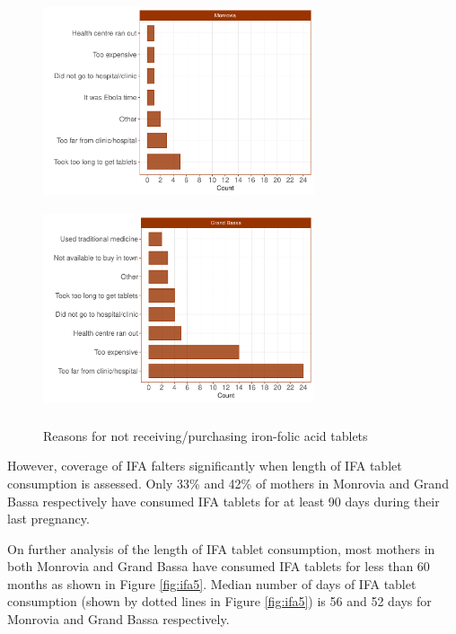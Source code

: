 \documentclass[12pt,a4paper]{article}
\begin{document}
\begin{figure}[H]

{\centering \includegraphics[width=8cm,height=6cm]{liberiaCoverageReport_files/figure-latex/ifa3a-1} \includegraphics[width=8cm,height=6cm]{liberiaCoverageReport_files/figure-latex/ifa3a-2} 

}

\caption{Reasons for not receiving/purchasing iron-folic acid tablets}\label{fig:ifa3a}
\end{figure}

However, coverage of IFA falters significantly when length of IFA tablet consumption is assessed. Only 33\% and 42\% of mothers in Monrovia and Grand Bassa respectively have consumed IFA tablets for at least 90 days during their last pregnancy.

On further analysis of the length of IFA tablet consumption, most mothers in both Monrovia and Grand Bassa have consumed IFA tablets for less than 60 months as shown in Figure \ref{fig:ifa5}. Median number of days of IFA tablet consumption (shown by dotted lines in Figure \ref{fig:ifa5}) is 56 and 52 days for Monrovia and Grand Bassa respectively.
\end{document}
